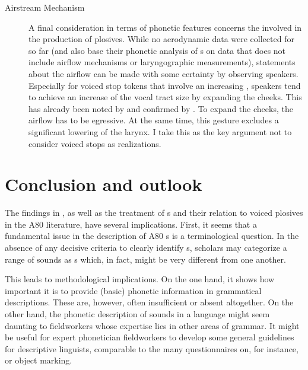 \documentclass[output=paper]{LSP/langsci}
\begin{document}
\begin{description}
\item[Airstream Mechanism] A final consideration in terms of phonetic features concerns the  involved in the production of plosives. While no aerodynamic data were collected for  so far (and also \citet{Nagano2012} base their phonetic analysis of  s on data that does not include airflow mechanisms or laryngographic measurements), statements about the airflow can be made with some certainty by observing speakers. Especially for voiced stop tokens that involve an increasing ,  speakers tend to achieve an increase of the vocal tract size by expanding the cheeks. This has already been noted by \citet{Renaud1976} and confirmed by \citet{Grimm2015}. To expand the cheeks, the airflow has to be egressive. At the same time, this gesture excludes a significant lowering of the larynx. I take this as the key argument not to consider  voiced stops as  realizations.




\end{description}




\section{Conclusion and outlook}
\label{sec:grimm:4}

The findings in , as well as the treatment of s and their relation to voiced plosives in the A80 literature, have several implications. First, it seems that a fundamental issue in the description of A80 s is a terminological question. In the absence of any decisive criteria to clearly identify s, scholars may categorize a range of sounds as s which, in fact, might be very different from one another. 

This leads to methodological implications. On the one hand, it shows how important it is to provide (basic) phonetic information in grammatical descriptions. These are, however, often insufficient or absent altogether. On the other hand, the phonetic description of sounds in a language might seem daunting to fieldworkers whose expertise lies in other areas of grammar. It might be useful for expert phonetician fieldworkers to develop some general guidelines for descriptive linguists, comparable to the many questionnaires on, for instance,  or object marking.
\end{document}
